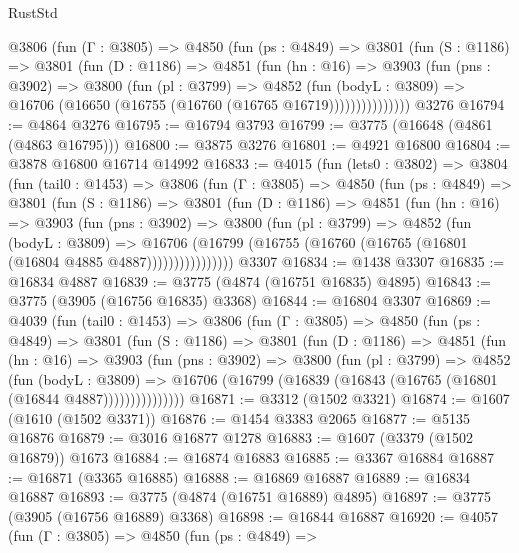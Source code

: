 \begin{lexlean}{RustStd}
\begin{coremodule}
        @3806
          (fun (Γ : @3805) =>
          @4850
            (fun (ps : @4849) =>
            @3801
              (fun (S : @1186) =>
              @3801
                (fun (D : @1186) =>
                @4851
                  (fun (hn : @16) =>
                  @3903
                    (fun (pns : @3902) =>
                    @3800
                      (fun (pl : @3799) =>
                      @4852
                        (fun (bodyL : @3809) =>
                        @16706 (@16650 (@16755 (@16760 (@16765 @16719)))))))))))))))
    @3276
@16794 := @4864 @3276
@16795 := @16794 @3793
@16799 := @3775 (@16648 (@4861 (@4863 @16795)))
@16800 := @3875 @3276
@16801 := @4921 @16800
@16804 := @3878 @16800 @16714 @14992
@16833 := @4015
    (fun (lets0 : @3802) =>
    @3804
      (fun (tail0 : @1453) =>
      @3806
        (fun (Γ : @3805) =>
        @4850
          (fun (ps : @4849) =>
          @3801
            (fun (S : @1186) =>
            @3801
              (fun (D : @1186) =>
              @4851
                (fun (hn : @16) =>
                @3903
                  (fun (pns : @3902) =>
                  @3800
                    (fun (pl : @3799) =>
                    @4852
                      (fun (bodyL : @3809) =>
                      @16706
                        (@16799 (@16755 (@16760 (@16765 (@16801 (@16804 @4885 @4887))))))))))))))))
    @3307
@16834 := @1438 @3307
@16835 := @16834 @4887
@16839 := @3775 (@4874 (@16751 @16835) @4895)
@16843 := @3775 (@3905 (@16756 @16835) @3368)
@16844 := @16804 @3307
@16869 := @4039
    (fun (tail0 : @1453) =>
    @3806
      (fun (Γ : @3805) =>
      @4850
        (fun (ps : @4849) =>
        @3801
          (fun (S : @1186) =>
          @3801
            (fun (D : @1186) =>
            @4851
              (fun (hn : @16) =>
              @3903
                (fun (pns : @3902) =>
                @3800
                  (fun (pl : @3799) =>
                  @4852
                    (fun (bodyL : @3809) =>
                    @16706 (@16799 (@16839 (@16843 (@16765 (@16801 (@16844 @4887)))))))))))))))
@16871 := @3312 (@1502 @3321)
@16874 := @1607 (@1610 (@1502 @3371))
@16876 := @1454 @3383 @2065
@16877 := @5135 @16876
@16879 := @3016 @16877 @1278
@16883 := @1607 (@3379 (@1502 @16879)) @1673
@16884 := @16874 @16883
@16885 := @3367 @16884
@16887 := @16871 (@3365 @16885)
@16888 := @16869 @16887
@16889 := @16834 @16887
@16893 := @3775 (@4874 (@16751 @16889) @4895)
@16897 := @3775 (@3905 (@16756 @16889) @3368)
@16898 := @16844 @16887
@16920 := @4057
    (fun (Γ : @3805) =>
    @4850
      (fun (ps : @4849) =>

\end{coremodule}
\end{lexlean}
